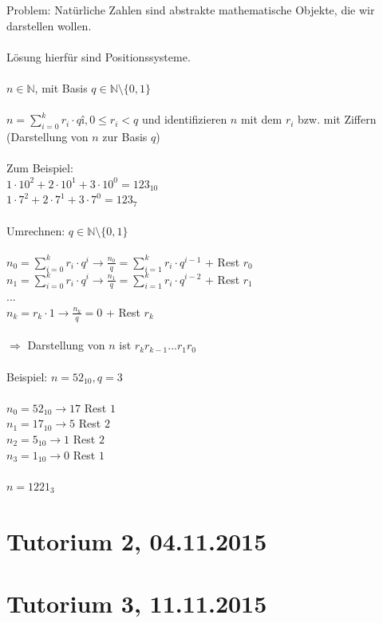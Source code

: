 \documentclass{llncs}
\begin{document}
Problem: Nat\"urliche Zahlen sind abstrakte mathematische Objekte, die wir darstellen wollen.\\
\\
L\"osung hierf\"ur sind Positionssysteme.\\
\\
$n  \in \mathbb{N}$, mit Basis $q \in \mathbb{N} \setminus \{0,1\}$\\
\\
$n = \sum_{i=0}^{k} r_i \cdot qî, 0 \leq r_i < q$ und identifizieren $n$ mit dem $r_i$ bzw. mit Ziffern (Darstellung von $n$ zur Basis $q$)\\
\\
Zum Beispiel:\\
$1 \cdot 10^2 + 2 \cdot 10^1 + 3 \cdot 10^0 = 123_{10}$\\
$1 \cdot 7^2 + 2 \cdot 7^1 + 3 \cdot 7^0 = 123_7$\\
\\
Umrechnen: $q \in \mathbb{N} \setminus \{0,1\}$\\
\\
$n_0 = \sum_{i=0}^{k} r_i \cdot q^i \longrightarrow \frac{n_0}{q} = \sum_{i=1}^{k} r_i \cdot q^{i-1}$ + Rest $r_0$\\
$n_1 = \sum_{i=0}^{k} r_i \cdot q^i \longrightarrow \frac{n_1}{q} = \sum_{i=1}^{k} r_i \cdot q^{i-2}$ + Rest $r_1$\\
...\\
$n_k = r_k \cdot 1 \longrightarrow \frac{n_k}{q} = 0$ + Rest $r_k$\\
\\
$\Rightarrow$ Darstellung von $n$ ist $r_k r_{k-1} ... r_1 r_0$\\
\\
Beispiel: $n = 52_{10}, q = 3$\\
\\
$n_0 = 52_{10} \longrightarrow 17$ Rest $1$\\
$n_1 = 17_{10} \longrightarrow  5$ Rest $2$\\
$n_2 =  5_{10} \longrightarrow  1$ Rest $2$\\
$n_3 =  1_{10} \longrightarrow  0$ Rest $1$\\
\\
$n = 1221_3$




\chapter*{Tutorium 2, 04.11.2015}

\chapter*{Tutorium 3, 11.11.2015}
\end{document}
